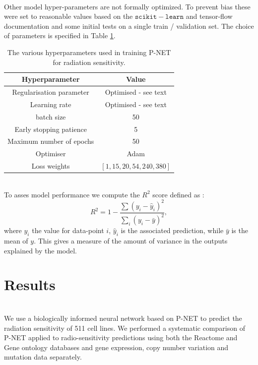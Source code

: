 \documentclass[NOTE, disdraft=true, UKenglish]{\DISCDTLATEXPATH UCLCDTDISdoc}
\begin{document}
\\ \indent Other model hyper-parameters are not formally optimized. To prevent bias these were set to reasonable values based on the $\mathtt{scikit-learn}$ and tensor-flow documentation and some initial tests on a single train / validation set. 
The choice of parameters is specified in Table \ref{tab:hyperpars}.
\begin{table}[]
    \centering
    \begin{tabular}{c|c}
       Hyperparameter  &  Value \\ \hline
       Regularisation parameter & Optimised - see text \\
       Learning rate  & Optimised - see text \\
      batch size  & 50 \\
      Early stopping patience &  5 \\
     Maximum number of epochs &  50 \\
     Optimiser &   Adam \\
     Loss weights &  $[1, 15, 20, 54, 240, 380]$ 
    \end{tabular}
    \caption{The various hyperparameters used in training P-NET for radiation sensitivity.}
    \label{tab:hyperpars}
\end{table}
\\ \indent To asses model performance we compute the $R^2$ score defined as \cite{scikit-learn-docs}:
\begin{equation}
    R^2 = 1-\frac{\sum (y_i - \hat{y}_i)^2}{\sum_i (y_i - \bar{y})^2},
\end{equation}
where $y_i$ the value for data-point $i$, $\hat{y}_i$ is the associated prediction, while $\bar{y}$ is the mean of $y$. This gives a measure of the amount of variance in the outputs explained by the model.
%



\section{Results}
\label{sec:results}
\\
We use a biologically informed neural network based on P-NET \cite{elmarakeby_biologically_2021} to predict the radiation sensitivity of 511 cell lines. 
We performed a systematic comparison of P-NET applied to radio-sensitivity predictions using both the Reactome \cite{reactome} and Gene ontology \cite{go_1,go_2} databases and gene expression, copy number variation and mutation data separately. 
\end{document}
